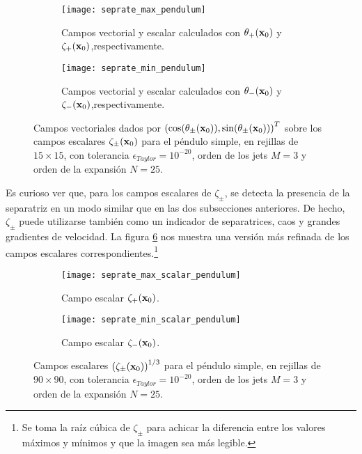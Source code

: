 \begin{figure}[h!]
\centering
\begin{subfigure}{0.49\textwidth}
	\centering
	\texttt{[image: seprate\_max\_pendulum]}
	\caption{Campos vectorial y escalar calculados con $\theta_+(\mathbf{x}_0)$ y $\zeta_+(\mathbf{x}_0)$,respectivamente.}
	\label{fig:seprate_max_pendulum}
\end{subfigure}
%
\begin{subfigure}{0.49\textwidth}
	\centering
	\texttt{[image: seprate\_min\_pendulum]}
	\caption{Campos vectorial y escalar calculados con $\theta_-(\mathbf{x}_0)$ y $\zeta_-(\mathbf{x}_0)$,respectivamente.}
	\label{fig:seprate_min_pendulum}
\end{subfigure}
\caption{ Campos vectoriales dados por $\left( \cos(\theta_\pm(\mathbf{x}_0)),\sin(\theta_\pm(\mathbf{x}_0)) \right)^T$ sobre los campos escalares $\zeta_\pm(\mathbf{x}_0)$ para el péndulo simple, en rejillas de $15\times15$, con tolerancia $\epsilon_{Taylor} = 10^{-20}$, orden de los jets $M=3$ y orden de la expansión $N=25$. }
\label{fig:seprate_pendulum}
\end{figure}

Es curioso ver que, para los campos escalares de $\zeta_\pm$, se detecta la presencia de la separatriz en un modo similar que en las dos subsecciones anteriores. De hecho, $\zeta_\pm$ puede utilizarse también como un indicador de separatrices, caos y grandes gradientes de velocidad. La figura \ref{fig:seprate_scalar_pendulum} nos muestra una versión más refinada de los campos escalares correspondientes.\footnote{Se toma la raíz cúbica de $\zeta_\pm$ para achicar la diferencia entre los valores máximos y mínimos y que la imagen sea más legible.} 

\begin{figure}[h!]
\centering
\begin{subfigure}{0.49\textwidth}
	\centering
	\texttt{[image: seprate\_max\_scalar\_pendulum]}
	\caption{Campo escalar $\zeta_+(\mathbf{x}_0)$.}
	\label{fig:seprate_max_scalar_pendulum}
\end{subfigure}
%
\begin{subfigure}{0.49\textwidth}
	\centering
	\texttt{[image: seprate\_min\_scalar\_pendulum]}
	\caption{Campo escalar $\zeta_-(\mathbf{x}_0)$.}
	\label{fig:seprate_min_scalar_pendulum}
\end{subfigure}
\caption{ Campos escalares $\left( \zeta_\pm(\mathbf{x}_0) \right)^{1/3}$ para el péndulo simple, en rejillas de $90\times 90$, con tolerancia $\epsilon_{Taylor} = 10^{-20}$, orden de los jets $M=3$ y orden de la expansión $N=25$. }
\label{fig:seprate_scalar_pendulum}
\end{figure}

